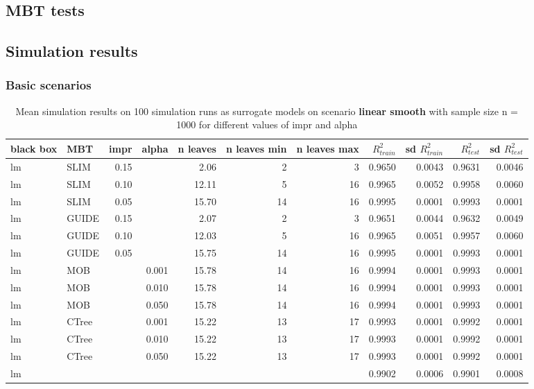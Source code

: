 \subsection{MBT tests}


\subsection{Simulation results}
\subsubsection{Basic scenarios}
\begin{table}

\caption{Mean simulation results on 100 simulation runs as surrogate models on scenario \textbf{linear smooth} with sample size n = 1000 for different values of impr and alpha}
\centering \tiny
\begin{tabular}[t]{l|l|r|r|r|r|r|r|r|r|r}
\hline
black box & MBT & impr & alpha & n leaves & n leaves min & n leaves max &  $R^2_{train}$ & sd $R^2_{train}$ & $R^2_{test}$ & sd $R^2_{test}$\\
\hline
lm & SLIM & 0.15 & & 2.06 & 2 & 3 & 0.9650 & 0.0043 & 0.9631 & 0.0046\\
lm & SLIM & 0.10 & & 12.11 & 5 & 16 & 0.9965 & 0.0052 & 0.9958 & 0.0060\\
lm & SLIM & 0.05 & & 15.70 & 14 & 16 & 0.9995 & 0.0001 & 0.9993 & 0.0001\\
lm & GUIDE & 0.15 & & 2.07 & 2 & 3 & 0.9651 & 0.0044 & 0.9632 & 0.0049\\
lm & GUIDE & 0.10 & & 12.03 & 5 & 16 & 0.9965 & 0.0051 & 0.9957 & 0.0060\\
lm & GUIDE & 0.05 & & 15.75 & 14 & 16 & 0.9995 & 0.0001 & 0.9993 & 0.0001\\
lm & MOB & & 0.001 & 15.78 & 14 & 16 & 0.9994 & 0.0001 & 0.9993 & 0.0001\\
lm & MOB & & 0.010 & 15.78 & 14 & 16 & 0.9994 & 0.0001 & 0.9993 & 0.0001\\
lm & MOB & & 0.050 & 15.78 & 14 & 16 & 0.9994 & 0.0001 & 0.9993 & 0.0001\\
lm & CTree & & 0.001 & 15.22 & 13 & 17 & 0.9993 & 0.0001 & 0.9992 & 0.0001\\
lm & CTree & & 0.010 & 15.22 & 13 & 17 & 0.9993 & 0.0001 & 0.9992 & 0.0001\\
lm & CTree & & 0.050 & 15.22 & 13 & 17 & 0.9993 & 0.0001 & 0.9992 & 0.0001\\
\hline
lm &  & & & & &  & 0.9902 & 0.0006 & 0.9901 & 0.0008\\
\hline


\end{tabular}
\end{table}
